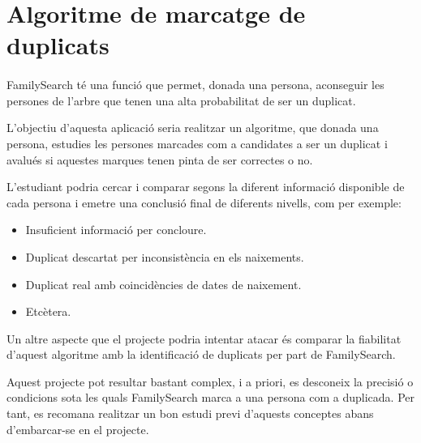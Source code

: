 \section{Algoritme de marcatge de duplicats}

    \paragraph{}
    FamilySearch té una funció que permet, donada una persona, aconseguir les persones de l'arbre que tenen una alta probabilitat de ser un duplicat.

    L'objectiu d'aquesta aplicació seria realitzar un algoritme, que donada una persona, estudies les persones marcades com a candidates a ser un duplicat  i avalués si aquestes marques tenen pinta de ser correctes o no.

    L'estudiant podria cercar i comparar segons la diferent informació disponible de cada persona i emetre una conclusió final de diferents nivells, com per exemple:

    \begin{itemize}
        \item Insuficient informació per concloure.
        \item Duplicat descartat per inconsistència en els naixements.
        \item Duplicat real amb coincidències de dates de naixement.
        \item Etcètera.
    \end{itemize}

    Un altre aspecte que el projecte podria intentar atacar és comparar la fiabilitat d'aquest algoritme amb la identificació de duplicats per part de FamilySearch.

    Aquest projecte pot resultar bastant complex, i a priori, es desconeix la precisió o condicions sota les quals FamilySearch marca a una persona com a duplicada. Per tant, es recomana realitzar un bon estudi previ d'aquests conceptes abans d'embarcar-se en el projecte.
